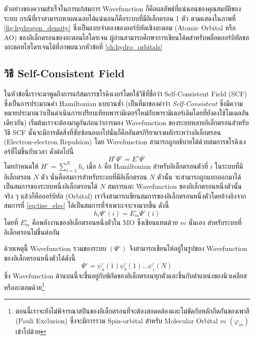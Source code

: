 ตัวอย่างของความสำเร็จในการแก้สมการ Wavefunction ก็คือผลลัพธ์ที่แน่นอนของคุณสมบัติของระบบ กรณีที่เราสามารถหาผลเฉลยได้แน่นอนก็คือระบบที่มีอิเล็กตรอน 1 ตัว ตามแสดงในภาพที่ \ref{fig:hydrogen_density} ซึ่งเป็นแบบจำลองของออร์บิทัลเชิงอะตอม (Atomic Orbital หรือ AO) ของอิเล็กตรอนของอะตอมไฮโดรเจน ผู้อ่านสามารถศึกษาการเขียนโค้ดสำหรับพล็อตออร์บิทัลของอะตอทไฮโดรเจนได้ที่ภาพผนวกหัวข้อที่
\ref{ch:hydro_orbitals}

\subsection{วิธี Self-Consistent Field}
\label{ssec:scf}

ในหัวข้อนี้เราจะมาพูดถึงการแก้สมการชโรดิงเงอร์โดยใช้วิธีที่ชื่อว่า Self-Consistent Field (SCF) ซึ่งเป็นการประมาณค่า Hamiltonian แบบวนซ้ำ (เป็นที่มาของคำว่า \textit{Self-Consistent} ซึ่งมีความหมายประมาณว่าเป็นดำเนินการเปรียบเทียบพารามิเตอร์ใหม่กับพารามิเตอร์เดิมโดยที่ยังคงใช้โมเดลอันเดียวกัน) เริ่มต้นเราจะต้องมาดูกันก่อนว่าการมอง Wavefunction ของระบบหลายอิเล็กตรอนสำหรับวิธี SCF นั้นจะมีการตัดสิ่งที่ซับซ้อนออกไปนั่นก็คืออันตรกิริยาแรงผลักระหว่างอิเล็กตรอน (Electron-electron Repulsion) โดย Wavefunction สามารถถูกอธิบายได้ด้วยสมการชโรดิงเงอร์ที่ไม่ขึ้นกับเวลา ดังต่อไปนี้\autocite{cramer2004}
%
\begin{equation}\label{eq:tise_elec}
    H^{\circ} \Psi^{\circ} = E^{\circ} \Psi^{\circ}
\end{equation}
%
โดยกำหนดให้ $H^{\circ} = \sum^{N}_{i=1} h_{i}$ เมื่อ $h$ คือ Hamiltonian สำหรับอิเล็กตรอนตัวที่ $i$ ในระบบที่มีอิเล็กตรอน $N$ ตัว นั่นคือสมการสำหรับระบบที่มีอิเล็กตรอน $N$ ตัวนั้น จะสามารถถูกแยกออกมาได้เป็นสมการของระบบหนึ่งอิเล็กตรอนได้ $N$ สมการและ Wavefunction ของอิเล็กตรอนหนึ่งตัวนั้นจริง ๆ แล้วก็คือออร์บิทัล (Orbital) เราจึงสามารถเขียนสมการของอิเล็กตรอนหนึ่งตัวโดยอ้างอิงจากสมการที่ \eqref{eq:tise_elec} ได้เป็นสมการที่จำเพาะเจาะจงมากขึ้น ดังนี้
%
\begin{equation}\label{eq:tise_elec_i}
    h_{i} \Psi^{\circ}(i) = E^{\circ}_{m} \Psi^{\circ}(i)
\end{equation}
%
\noindent โดยที่ $E^{\circ}_{m}$ คือพลังงานของอิเล็กตรอนหนึ่งตัวใน MO ซึ่งเขียนแทนด้วย $m$ นั่นเอง สำหรับระบบที่อิเล็กตรอนไม่ขึ้นต่อกัน

ด้วยเหตุนี้ Wavefunction รวมของระบบ $(\Psi^{\circ})$ จึงสามารถเขียนให้อยู่ในรูปของ Wavefunction ของอิเล็กตรอนหนึ่งตัวได้ดังนี้
%
\begin{equation}
    \Psi^{\circ} = \psi^{\circ}_{a}(1) \psi^{\circ}_{b}(1) \dots \psi^{\circ}_{z}(N)
\end{equation}
%
\noindent ซึ่ง Wavefunction ด้านบนนี้จะขึ้นอยู่กับพิกัดของอิเล็กตรอนทุกตัวและขึ้นกับตำแหน่งของนิวเคลียสหรืออะตอมด้วย\footnote{ตอนนี้เราจะยังไม่พิจารณาสปินของอิเล็กตรอนที่จะต้องสอดคล้องและไม่ขัดกับหลักกีดกันของเพาลี (Pauli Exclusion)     ซึ่งจะมีการรวม Spin-orbital สำหรับ Molecular Orbital $m$ $(\varphi_{m})$ เข้าไปด้วย}

